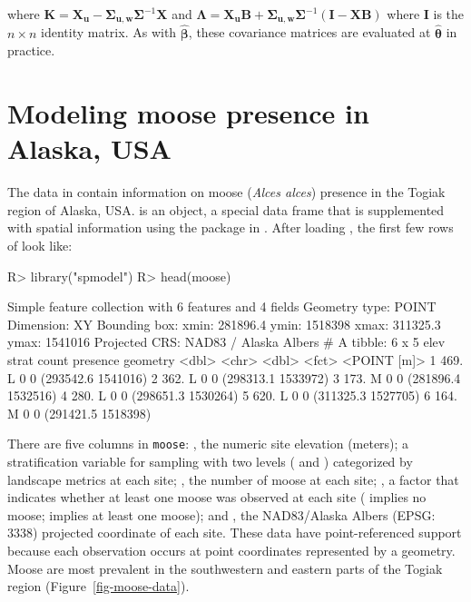 \documentclass[
]{jss}
\begin{document}
where
\(\mathbf{K} = \mathbf{X}_{\mathbf{u}} - \boldsymbol{\Sigma}_{\mathbf{u},\mathbf{w}} \boldsymbol{\Sigma}^{-1} \mathbf{X}\)
and
\(\boldsymbol{\Lambda} = \mathbf{X}_{\mathbf{u}}\mathbf{B} + \boldsymbol{\Sigma}_{\mathbf{u},\mathbf{w}}\boldsymbol{\Sigma}^{-1}(\mathbf{I} - \mathbf{X}\mathbf{B})\)
where \(\mathbf{I}\) is the \(n \times n\) identity matrix. As with
\(\hat{\boldsymbol{\beta}}\), these covariance matrices are evaluated at
\(\hat{\boldsymbol{\theta}}\) in practice.

\section{Modeling moose presence in Alaska, USA}\label{sec-applications}

The  data in  contain information on moose
(\emph{Alces alces}) presence in the Togiak region of Alaska, USA.
 is an  object, a special data frame that is
supplemented with spatial information using the  package in
 \citep{pebesma2018sf}. After loading , the
first few rows of  look like:

\begin{CodeChunk}
\begin{CodeInput}
R> library("spmodel")
R> head(moose)
\end{CodeInput}
\begin{CodeOutput}
Simple feature collection with 6 features and 4 fields
Geometry type: POINT
Dimension:     XY
Bounding box:  xmin: 281896.4 ymin: 1518398 xmax: 311325.3 ymax: 1541016
Projected CRS: NAD83 / Alaska Albers
# A tibble: 6 x 5
   elev strat count presence           geometry
  <dbl> <chr> <dbl> <fct>           <POINT [m]>
1  469. L         0 0        (293542.6 1541016)
2  362. L         0 0        (298313.1 1533972)
3  173. M         0 0        (281896.4 1532516)
4  280. L         0 0        (298651.3 1530264)
5  620. L         0 0        (311325.3 1527705)
6  164. M         0 0        (291421.5 1518398)
\end{CodeOutput}
\end{CodeChunk}

There are five columns in \texttt{moose}: , the numeric site
elevation (meters);  a stratification variable for sampling
with two levels ( and ) categorized by landscape
metrics at each site; , the number of moose at each site;
, a factor that indicates whether at least one moose was
observed at each site ( implies no moose;  implies at
least one moose); and , the NAD83/Alaska Albers (EPSG:
3338) projected coordinate of each site. These data have
point-referenced support because each observation occurs at point
coordinates represented by a  geometry. Moose are most
prevalent in the southwestern and eastern parts of the Togiak region
(Figure~\ref{fig-moose-data}).
\end{document}
